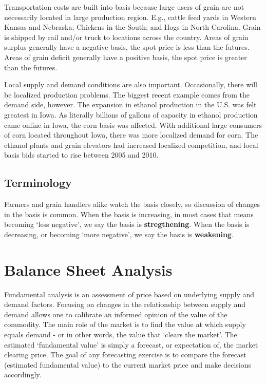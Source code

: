 \documentclass[]{book}
\theoremstyle{definition}
\theoremstyle{definition}
\theoremstyle{remark}
\begin{document}
Transportation costs are built into basis because large users of grain
are not necessarily located in large production region. E.g., cattle
feed yards in Western Kansas and Nebraska; Chickens in the South; and
Hogs in North Carolina. Grain is shipped by rail and/or truck to
locations across the country. Areas of grain surplus generally have a
negative basis, the spot price is less than the futures. Areas of grain
deficit generally have a positive basis, the spot price is greater than
the futures.

Local supply and demand conditions are also important. Occasionally,
there will be localized production problems. The biggest recent example
comes from the demand side, however. The expansion in ethanol production
in the U.S. was felt greatest in Iowa. As literally billions of gallons
of capacity in ethanol production came online in Iowa, the corn basis
was affected. With additional large consumers of corn located throughout
Iowa, there was more localized demand for corn. The ethanol plants and
grain elevators had increased localized competition, and local basis
bids started to rise between 2005 and 2010.

\section{Terminology}\label{terminology}

Farmers and grain handlers alike watch the basis closely, so discussion
of changes in the basis is common. When the basis is increasing, in most
cases that means becoming `less negative', we say the basis is
\textbf{stregthening}. When the basis is decreasing, or becoming `more
negative', we say the basis is \textbf{weakening}.

\chapter{Balance Sheet Analysis}\label{balance-sheet-analysis}

Fundamental analysis is an assessment of price based on underlying
supply and demand factors. Focusing on changes in the relationship
between supply and demand allows one to calibrate an informed opinion of
the value of the commodity. The main role of the market is to find the
value at which supply equals demand - or in other words, the value that
`clears the market'. The estimated `fundamental value' is simply a
forecast, or expectation of, the market clearing price. The goal of any
forecasting exercise is to compare the forecast (estimated fundamental
value) to the current market price and make decisions accordingly.
\end{document}
